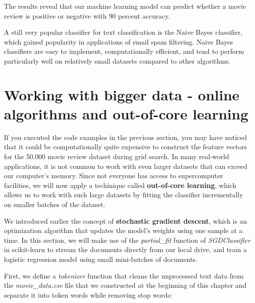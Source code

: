 \documentclass[11pt]{article}
\begin{document}
    The results reveal that our machine learning model can predict whether a
movie review is positive or negative with 90 percent accuracy.

A still very popular classifier for text classification is the Naive
Bayes classifier, which gained popularity in applications of email spam
filtering. Naive Bayes classifiers are easy to implement,
computationally efficient, and tend to perform particularly well on
relatively small datasets compared to other algorithms.

    \section{Working with bigger data - online algorithms and out-of-core
learning}\label{working-with-bigger-data---online-algorithms-and-out-of-core-learning}

    If you executed the code examples in the previous section, you may have
noticed that it could be computationally quite expensive to construct
the feature vectors for the 50.000 movie review dataset during grid
search. In many real-world applications, it is not common to work with
even larger datasets that can exceed our computer's memory. Since not
everyone has access to supercomputer facilities, we will now apply a
techinique called \textbf{out-of-core learning}, which allows us to work
with such large datasets by fitting the classifier incrementally on
smaller batches of the dataset.

We introduced earlier the concept of \textbf{stochastic gradient
descent}, which is an optimization algorithm that updates the model's
weights using one sample at a time. In this section, we will make use of
the \emph{partial\_fit} function of \emph{SGDClassifier} in scikit-learn
to stream the documents directly from our local drive, and train a
logistic regression model using small mini-batches of documents.

First, we define a \emph{tokenizer} function that cleans the unprocessed
text data from the \emph{movie\_data.csv} file that we constructed at
the beginning of this chapter and separate it into token words while
removing stop words:
\end{document}

